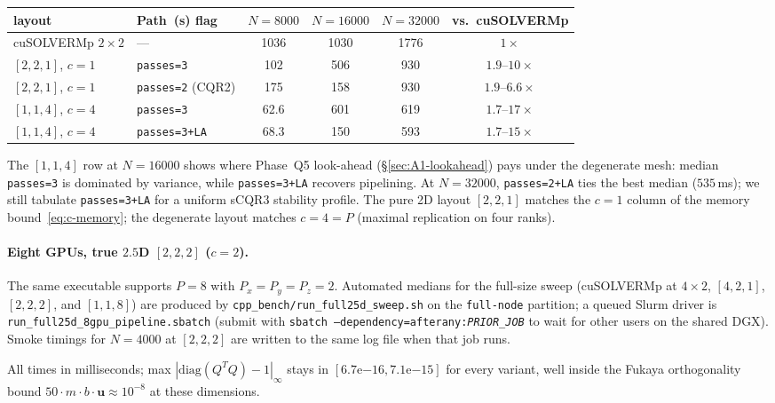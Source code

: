 \documentclass[11pt]{article}
\begin{document}
\begin{center}
\renewcommand{\arraystretch}{1.05}
\begin{tabular}{l l ccc | c}
\toprule
layout & Path~(s) flag & $N{=}8000$ & $N{=}16000$ & $N{=}32000$ & vs.\ cuSOLVERMp \\
\midrule
cuSOLVERMp $2{\times}2$ & --- & 1036 & 1030 & 1776 & $1\times$ \\
$[2,2,1]$, $c{=}1$ & \texttt{passes=3} & 102 & 506 & 930 & $1.9$--$10\times$ \\
$[2,2,1]$, $c{=}1$ & \texttt{passes=2} (CQR2) & 175 & 158 & 930 & $1.9$--$6.6\times$ \\
$[1,1,4]$, $c{=}4$ & \texttt{passes=3} & 62.6 & 601 & 619 & $1.7$--$17\times$ \\
$[1,1,4]$, $c{=}4$ & \texttt{passes=3+LA} & 68.3 & 150 & 593 & $1.7$--$15\times$ \\
\bottomrule
\end{tabular}
\end{center}

The $[1,1,4]$ row at $N{=}16000$ shows where Phase~Q5 look-ahead
(\S\ref{sec:A1-lookahead}) pays under the degenerate mesh: median
\texttt{passes=3} is dominated by variance, while \texttt{passes=3+LA}
recovers pipelining.  At $N{=}32000$, \texttt{passes=2+LA} ties the best
median ($535$\,ms); we still tabulate \texttt{passes=3+LA} for a uniform
sCQR3 stability profile.  The pure 2D layout $[2,2,1]$ matches the
$c{=}1$ column of the memory bound~\eqref{eq:c-memory}; the degenerate
layout matches $c{=}4{=}P$ (maximal replication on four ranks).

\paragraph{Eight GPUs, true $2.5$D $[2,2,2]$ ($c{=}2$).}
The same executable supports $P{=}8$ with $P_x{=}P_y{=}P_z{=}2$.
Automated medians for the full-size sweep (cuSOLVERMp at $4{\times}2$,
$[4,2,1]$, $[2,2,2]$, and $[1,1,8]$) are produced by
\texttt{cpp\_bench/run\_full25d\_sweep.sh} on the \texttt{full-node}
partition; a queued Slurm driver is \texttt{run\_full25d\_8gpu\_pipeline.sbatch}
(submit with \texttt{sbatch --dependency=afterany:\textit{PRIOR\_JOB}}
to wait for other users on the shared DGX).  Smoke timings for
$N{=}4000$ at $[2,2,2]$ are written to the same log file when that job
runs.

All times in milliseconds; max $|\mathrm{diag}(Q^T Q) - 1|_\infty$ stays
in $[6.7\text{e}{-16}, 7.1\text{e}{-15}]$ for every variant, well inside
the Fukaya orthogonality bound $50 \cdot m \cdot b \cdot \mathbf{u}
\approx 10^{-8}$ at these dimensions.
\end{document}
